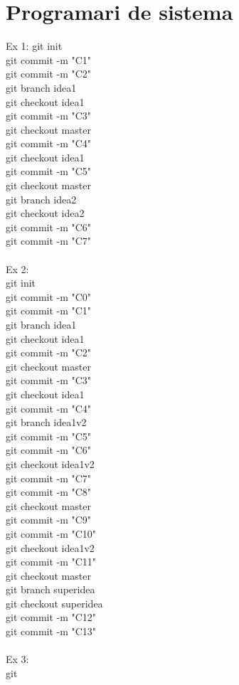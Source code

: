 \section{Programari de sistema}
\newpage
{}
Ex 1: 
git init\\
git commit -m "C1"\\
git commit -m "C2"\\
git branch idea1\\
git checkout idea1\\
git commit -m "C3"\\
git checkout master\\
git commit -m "C4"\\
git checkout idea1\\
git commit -m "C5"\\
git checkout master\\
git branch idea2\\
git checkout idea2\\
git commit -m "C6"\\
git commit -m "C7"\\
\\
Ex 2:\\
git init\\
git commit -m "C0"\\
git commit -m "C1"\\
git branch idea1\\
git checkout idea1\\
git commit -m "C2"\\
git checkout master\\
git commit -m "C3"\\
git checkout idea1\\
git commit -m "C4"\\
git branch idea1v2\\
git commit -m "C5"\\
git commit -m "C6"\\
git checkout idea1v2\\
git commit -m "C7"\\
git commit -m "C8"\\
git checkout master\\
git commit -m "C9"\\
git commit -m "C10"\\
git checkout idea1v2\\
git commit -m "C11"\\
git checkout master\\
git branch superidea\\
git checkout superidea\\
git commit -m "C12"\\
git commit -m "C13"\\
\\
Ex 3:\\
git 